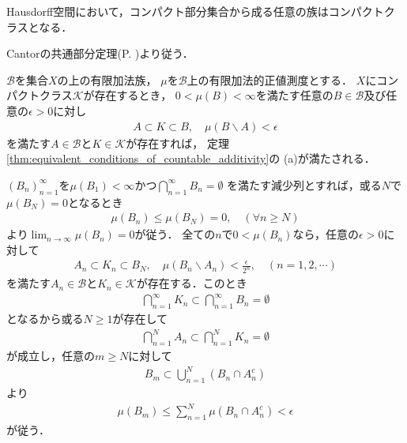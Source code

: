 		\begin{screen}
			\begin{thm}\label{thm:compact_class_Haudorff}
				Hausdorff空間において，コンパクト部分集合から成る任意の族はコンパクトクラスとなる．
			\end{thm}
		\end{screen}
		
		\begin{prf}
			Cantorの共通部分定理(P. \pageref{thm:Cantor_intersection_theorem})より従う．
			\QED
		\end{prf}
		
		\begin{screen}
			\begin{thm}[コンパクトクラスと共通点性]\label{thm:compact_class_intersection}
				$\mathcal{B}$を集合$X$の上の有限加法族，
				$\mu$を$\mathcal{B}$上の有限加法的正値測度とする．
				$X$にコンパクトクラス$\mathcal{K}$が存在するとき，
				$0 < \mu(B) < \infty$を満たす任意の$B \in \mathcal{B}$及び任意の$\epsilon > 0$に対し
				\begin{align}
					A \subset K \subset B,
					\quad \mu(B \backslash A) < \epsilon
				\end{align}
				を満たす$A \in \mathcal{B}$と$K \in \mathcal{K}$が存在すれば，
				定理\ref{thm:equivalent_conditions_of_countable_additivity}の
				(a)が満たされる．
			\end{thm}
		\end{screen}
		
		\begin{prf}
			$(B_n)_{n=1}^\infty$を$\mu(B_1) < \infty$かつ$\bigcap_{n=1}^\infty B_n = \emptyset$
			を満たす減少列とすれば，或る$N$で$\mu(B_N) = 0$となるとき
			\begin{align}
				\mu(B_n) \leq \mu(B_N) = 0,
				\quad (\forall n \geq N)
			\end{align}
			より$\lim_{n \to \infty} \mu(B_n) = 0$が従う．
			全ての$n$で$0 < \mu(B_n)$なら，任意の$\epsilon > 0$に対して
			\begin{align}
				A_n \subset K_n \subset B_N,
				\quad \mu(B_n \backslash A_n) < \frac{\epsilon}{2^n},
				\quad (n=1,2,\cdots)
			\end{align}
			を満たす$A_n \in \mathcal{B}$と$K_n \in \mathcal{K}$が存在する．このとき
			\begin{align}
				\bigcap_{n=1}^\infty K_n \subset \bigcap_{n=1}^\infty B_n = \emptyset
			\end{align}
			となるから或る$N \geq 1$が存在して
			\begin{align}
				\bigcap_{n=1}^N A_n \subset \bigcap_{n=1}^N K_n = \emptyset
			\end{align}
			が成立し，任意の$m \geq N$に対して
			\begin{align}
				B_m \subset \bigcup_{n=1}^N (B_n \cap A_n^c)
			\end{align}
			より
			\begin{align}
				\mu(B_m) \leq \sum_{n=1}^N \mu(B_n \cap A_n^c) < \epsilon
			\end{align}
			が従う．
			\QED
		\end{prf}
		
